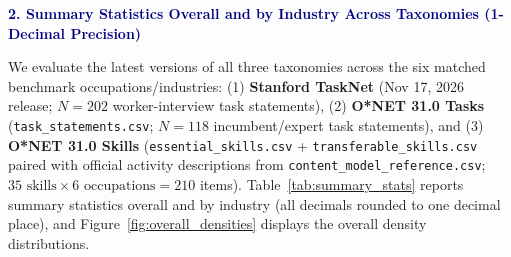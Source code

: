 \documentclass[9pt,letterpaper]{extarticle}
\begin{document}
\newpage
{\normalsize\sffamily\bfseries\textcolor{navy}{2. Summary Statistics Overall and by Industry Across Taxonomies (1-Decimal Precision)}}

We evaluate the latest versions of all three taxonomies across the six matched benchmark occupations/industries: (1) \textbf{Stanford TaskNet} (Nov 17, 2026 release; $N=202$ worker-interview task statements), (2) \textbf{O*NET 31.0 Tasks} (\texttt{task\_statements.csv}; $N=118$ incumbent/expert task statements), and (3) \textbf{O*NET 31.0 Skills} (\texttt{essential\_skills.csv} + \texttt{transferable\_skills.csv} paired with official activity descriptions from \texttt{content\_model\_reference.csv}; $35 \text{ skills} \times 6 \text{ occupations} = 210$ items). Table~\ref{tab:summary_stats} reports summary statistics overall and by industry (all decimals rounded to one decimal place), and Figure~\ref{fig:overall_densities} displays the overall density distributions.
\end{document}
